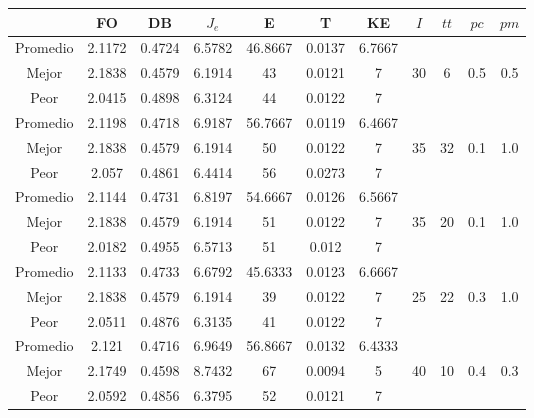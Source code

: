 \begin{table}[h!]
    \footnotesize
    \begin{center}
        \begin{tabular}{|c|c|c|c|c|c|c|c|c|c|c|}
        \hline
             & {\bf FO} & {\bf DB} & $J_e$ & {\bf E} & {\bf T} & {\bf KE} & $I$ & $tt$ & $pc$ & $pm$ \\
        \hline
        \hline
            Promedio  & 2.1172 & 0.4724 & 6.5782 & 46.8667 & 0.0137 & 6.7667 &  &  &  & \\
            \cline{1-7}
            Mejor & 2.1838 & 0.4579  & 6.1914 & 43 & 0.0121 & 7 & 30 & 6 & 0.5 & 0.5\\
            \cline{1-7}
            Peor & 2.0415 & 0.4898  & 6.3124 & 44 & 0.0122 & 7 &  &  &  & \\
        \hline
        \hline
            Promedio  & 2.1198 & 0.4718 & 6.9187 & 56.7667 & 0.0119 & 6.4667 &  &  &  & \\
            \cline{1-7}
            Mejor & 2.1838 & 0.4579  & 6.1914 & 50 & 0.0122 & 7 & 35 & 32 & 0.1 & 1.0\\
            \cline{1-7}
            Peor & 2.057 & 0.4861  & 6.4414 & 56 & 0.0273 & 7 &  &  &  & \\
        \hline
        \hline
            Promedio  & 2.1144 & 0.4731 & 6.8197 & 54.6667 & 0.0126 & 6.5667 &  &  &  & \\
            \cline{1-7}
            Mejor & 2.1838 & 0.4579  & 6.1914 & 51 & 0.0122 & 7 & 35 & 20 & 0.1 & 1.0\\
            \cline{1-7}
            Peor & 2.0182 & 0.4955  & 6.5713 & 51 & 0.012 & 7 &  &  &  & \\
        \hline
        \hline
            Promedio  & 2.1133 & 0.4733 & 6.6792 & 45.6333 & 0.0123 & 6.6667 &  &  &  & \\
            \cline{1-7}
            Mejor & 2.1838 & 0.4579  & 6.1914 & 39 & 0.0122 & 7 & 25 & 22 & 0.3 & 1.0\\
            \cline{1-7}
            Peor & 2.0511 & 0.4876  & 6.3135 & 41 & 0.0122 & 7 &  &  &  & \\
        \hline
        \hline
            Promedio  & 2.121 & 0.4716 & 6.9649 & 56.8667 & 0.0132 & 6.4333 &  &  &  & \\
            \cline{1-7}
            Mejor & 2.1749 & 0.4598  & 8.7432 & 67 & 0.0094 & 5 & 40 & 10 & 0.4 & 0.3\\
            \cline{1-7}
            Peor & 2.0592 & 0.4856  & 6.3795 & 52 & 0.0121 & 7 &  &  &  & \\

\end{tabular}
\end{center}
\end{table}
